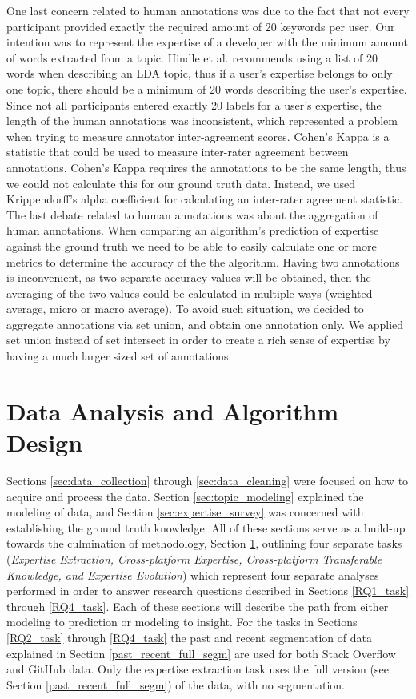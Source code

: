             One last concern related to human annotations was due to the fact that not every participant provided exactly the required amount of 20 keywords per user. Our intention was to represent the expertise of a developer with the minimum amount of words extracted from a topic. Hindle et al. \cite{hindle2012relating} recommends using a list of 20 words when describing an LDA topic, thus if a user's expertise belongs to only one topic, there should be a minimum of 20 words describing the user's expertise. Since not all participants entered exactly 20 labels for a user's expertise, the length of the human annotations was inconsistent, which represented a problem when trying to measure annotator inter-agreement scores. Cohen's Kappa \cite{cohen1960coefficient} is a statistic that could be used to measure inter-rater agreement between annotations. Cohen's Kappa requires the annotations to be the same length, thus we could not calculate this for our ground truth data. Instead, we used Krippendorff's alpha coefficient \cite{krippendorff2013content} for calculating an inter-rater agreement statistic. The last debate related to human annotations was about the aggregation of human annotations. When comparing an algorithm's prediction of expertise against the ground truth we need to be able to easily calculate one or more metrics to determine the accuracy of the the algorithm. Having two annotations is inconvenient, as two separate accuracy values will be obtained, then the averaging of the two values could be calculated in multiple ways (weighted average, micro or macro average). To avoid such situation, we decided to aggregate annotations via set union, and obtain one annotation only. We applied set union instead of set intersect in order to create a rich sense of expertise by having a much larger sized set of annotations.
        
\section{Data Analysis and Algorithm Design} \label{sec:algo_design}

    Sections \ref{sec:data_collection} through \ref{sec:data_cleaning} were focused on how to acquire and process the data. Section \ref{sec:topic_modeling} explained the modeling of data, and Section \ref{sec:expertise_survey} was concerned with establishing the ground truth knowledge. All of these sections serve as a build-up towards the culmination of methodology, Section \ref{sec:algo_design}, outlining four separate tasks (\emph{Expertise Extraction, Cross-platform Expertise, Cross-platform Transferable Knowledge, and Expertise Evolution}) which represent four separate analyses performed in order to answer research questions described in Sections \ref{RQ1_task} through \ref{RQ4_task}. Each of these sections will describe the path from either modeling to prediction or modeling to insight. For the tasks in Sections \ref{RQ2_task} through \ref{RQ4_task} the past and recent segmentation of data explained in Section \ref{past_recent_full_segm} are used for both Stack Overflow and GitHub data. Only the expertise extraction task uses the full version (see Section \ref{past_recent_full_segm}) of the data, with no segmentation. 
    
